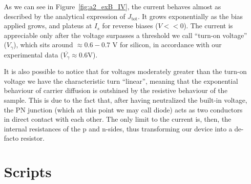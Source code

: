 \documentclass{book}
\begin{document}
            As we can see in Figure~\ref{fig:a2_exB_IV}, the current behaves almost as described by the analytical expression of $J_{\text{tot}}$.
            It grows exponentially as the bias applied grows, and plateus at $I_{s}$ for reverse biases ($V << 0$).
            The current is appreciable only after the voltage surpasses a threshold we call ``turn-on voltage'' ($V_{\gamma}$), which sits around $\approx 0.6-0.7$ V for silicon, in accordance with our experimental data ($\overline{V_{\gamma}} \approx 0.6$V).

            \vspace{10pt}
            It is also possible to notice that for voltages moderately greater than the turn-on voltage we have the characteristic turn ``linear'', meaning that the exponential behaviour of carrier diffusion is outshined by the resistive behaviour of the sample.
            This is due to the fact that, after having neutralized the built-in voltage, the PN junction (which at this point we may call diode) acts as two conductors in direct contact with each other.
            The only limit to the current is, then, the internal resistances of the p and n-sides, thus transforming our device into a de-facto resistor.

    \newpage
    \pagestyle{plain}
    \chapter*{Scripts}
        
\end{document}
